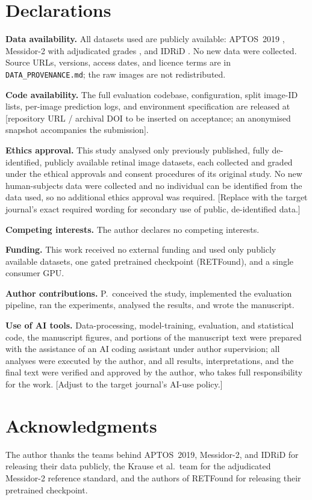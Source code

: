 \documentclass[journal]{IEEEtran}
\begin{document}
\section*{Declarations}

\textbf{Data availability.} All datasets used are publicly available: APTOS~2019
\cite{aptos2019}, Messidor-2 \cite{decenciere2014,abramoff2013} with adjudicated
grades \cite{krause2018}, and IDRiD \cite{porwal2018,porwal2020}. No new data were
collected. Source URLs, versions, access dates, and licence terms are in
\texttt{DATA\_PROVENANCE.md}; the raw images are not redistributed.

\textbf{Code availability.} The full evaluation codebase, configuration, split
image-ID lists, per-image prediction logs, and environment specification are
released at [repository URL / archival DOI to be inserted on acceptance; an
anonymised snapshot accompanies the submission].

\textbf{Ethics approval.} This study analysed only previously published, fully
de-identified, publicly available retinal image datasets, each collected and
graded under the ethical approvals and consent procedures of its original study.
No new human-subjects data were collected and no individual can be identified from
the data used, so no additional ethics approval was required. [Replace with the
target journal's exact required wording for secondary use of public,
de-identified data.]

\textbf{Competing interests.} The author declares no competing interests.

\textbf{Funding.} This work received no external funding and used only publicly
available datasets, one gated pretrained checkpoint (RETFound), and a single
consumer GPU.

\textbf{Author contributions.} P.\ conceived the study, implemented the
evaluation pipeline, ran the experiments, analysed the results, and wrote the
manuscript.

\textbf{Use of AI tools.} Data-processing, model-training, evaluation, and
statistical code, the manuscript figures, and portions of the manuscript text
were prepared with the assistance of an AI coding assistant under author
supervision; all analyses were executed by the author, and all results,
interpretations, and the final text were verified and approved by the author, who
takes full responsibility for the work. [Adjust to the target journal's AI-use
policy.]

\section*{Acknowledgments}
The author thanks the teams behind APTOS~2019, Messidor-2, and IDRiD for
releasing their data publicly, the Krause et al.\ team for the adjudicated
Messidor-2 reference standard, and the authors of RETFound for releasing their
pretrained checkpoint.



\end{document}
